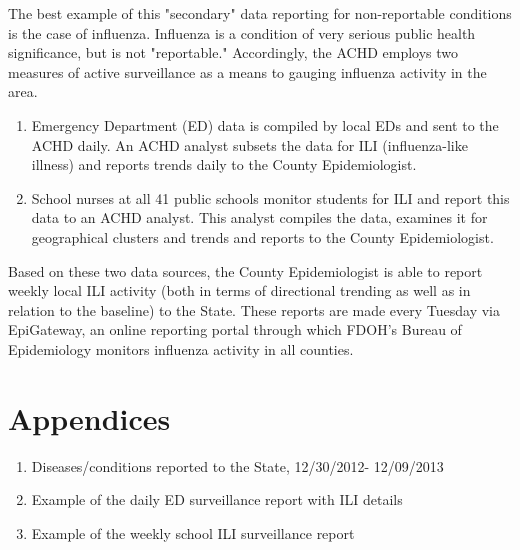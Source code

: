 \documentclass{article}
\begin{document}
The best example of this "secondary" data reporting for non-reportable conditions is the case of influenza.  Influenza is a condition of very serious public health significance, but is not "reportable."  Accordingly, the ACHD employs two measures of active surveillance as a means to gauging influenza activity in the area.\\  
\begin{enumerate}
\item Emergency Department (ED) data is compiled by local EDs and sent to the ACHD daily.  An ACHD analyst subsets the data for ILI (influenza-like illness) and reports trends daily to the County Epidemiologist.  
\item School nurses at all 41 public schools monitor students for ILI and report this data to an ACHD analyst.  This analyst compiles the data, examines it for geographical clusters and trends and reports to the County Epidemiologist.\\  
\end{enumerate}
Based on these two data sources, the County Epidemiologist is able to report weekly local ILI activity (both in terms of directional trending as well as in relation to the baseline) to the State.  These reports are made every Tuesday via EpiGateway, an online reporting portal through which FDOH's Bureau of Epidemiology monitors influenza activity in all counties.\\


\section*{Appendices}
\begin{enumerate}
\item Diseases/conditions reported to the State, 12/30/2012- 12/09/2013
\item Example of the daily ED surveillance report with ILI details
\item Example of the weekly school ILI surveillance report
\end{enumerate}
\end{document}
